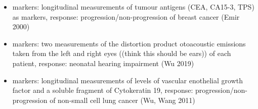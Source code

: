 \documentclass{beamer}
\begin{document}
\begin{frame}
  \begin{itemize}
  \item markers: longitudinal measurements of tumour antigens (CEA,
    CA15-3, TPS) as markers, response: progression/non-progression of breast
    cancer (Emir 2000)

  \item markers: two measurements of the distortion product otoacoustic
    emissions taken from the left and right eyes ((think this should
    be ears)) of each patient, response: neonatal hearing impairment
    (Wu 2019)

  \item markers: longitudinal measurements of levels of vascular
    enothelial growth factor and a soluble fragment of Cytokeratin 19,
    response: progression/non-progression of non-small cell lung
    cancer (Wu, Wang 2011)
   \end{itemize}
 \end{frame}
 
\end{document}
